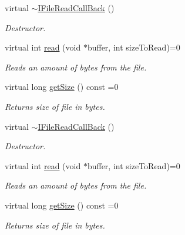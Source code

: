 \begin{DoxyCompactItemize}
\item 
\mbox{\label{classirr_1_1io_1_1IFileReadCallBack_a91ace84f0a3966d88d78da5342eb9619}} 
virtual \hyperlink{classirr_1_1io_1_1IFileReadCallBack_a91ace84f0a3966d88d78da5342eb9619}{$\sim$\+I\+File\+Read\+Call\+Back} ()
\begin{DoxyCompactList}\small\item\em Destructor. \end{DoxyCompactList}\item 
virtual int \hyperlink{classirr_1_1io_1_1IFileReadCallBack_ae8c57b8454078aa2acd39772a6aa4439}{read} (void $\ast$buffer, int size\+To\+Read)=0
\begin{DoxyCompactList}\small\item\em Reads an amount of bytes from the file. \end{DoxyCompactList}\item 
\mbox{\label{classirr_1_1io_1_1IFileReadCallBack_aba9a5b45e5cdead9fb12def3069bd0ec}} 
virtual long \hyperlink{classirr_1_1io_1_1IFileReadCallBack_aba9a5b45e5cdead9fb12def3069bd0ec}{get\+Size} () const =0
\begin{DoxyCompactList}\small\item\em Returns size of file in bytes. \end{DoxyCompactList}\item 
\mbox{\label{classirr_1_1io_1_1IFileReadCallBack_a91ace84f0a3966d88d78da5342eb9619}} 
virtual \hyperlink{classirr_1_1io_1_1IFileReadCallBack_a91ace84f0a3966d88d78da5342eb9619}{$\sim$\+I\+File\+Read\+Call\+Back} ()
\begin{DoxyCompactList}\small\item\em Destructor. \end{DoxyCompactList}\item 
virtual int \hyperlink{classirr_1_1io_1_1IFileReadCallBack_ae8c57b8454078aa2acd39772a6aa4439}{read} (void $\ast$buffer, int size\+To\+Read)=0
\begin{DoxyCompactList}\small\item\em Reads an amount of bytes from the file. \end{DoxyCompactList}\item 
\mbox{\label{classirr_1_1io_1_1IFileReadCallBack_aba9a5b45e5cdead9fb12def3069bd0ec}} 
virtual long \hyperlink{classirr_1_1io_1_1IFileReadCallBack_aba9a5b45e5cdead9fb12def3069bd0ec}{get\+Size} () const =0
\begin{DoxyCompactList}\small\item\em Returns size of file in bytes. \end{DoxyCompactList}\end{DoxyCompactItemize}


